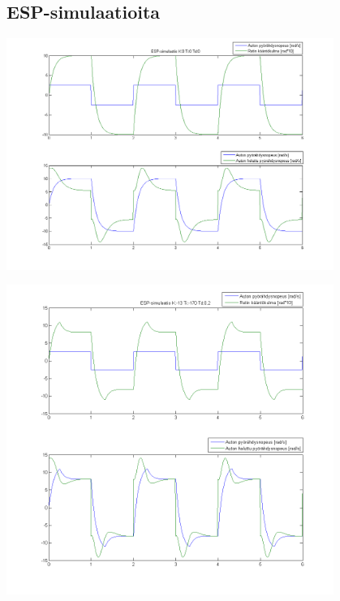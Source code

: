 \documentclass{article}
\begin{document}
\begin{appendices}
\section{ESP-simulaatioita} \label{app:espsim}
{\centering \includegraphics[width=0.8\textwidth]{espSim1}

\includegraphics[width=0.8\textwidth]{espSim2}}
\end{appendices}
\end{document}
